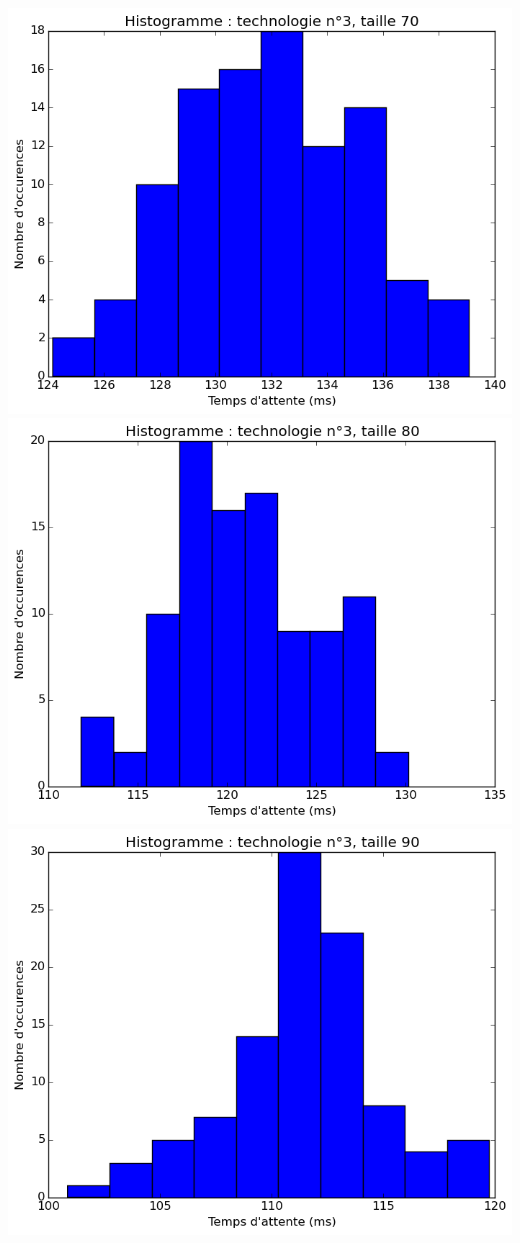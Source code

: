 \documentclass[a4paper,10pt]{article}
\begin{document}
\\
\includegraphics[scale=0.4]{img/3-70.png}
\includegraphics[scale=0.4]{img/3-80.png}
\\
\includegraphics[scale=0.4]{img/3-90.png}
\end{document}
